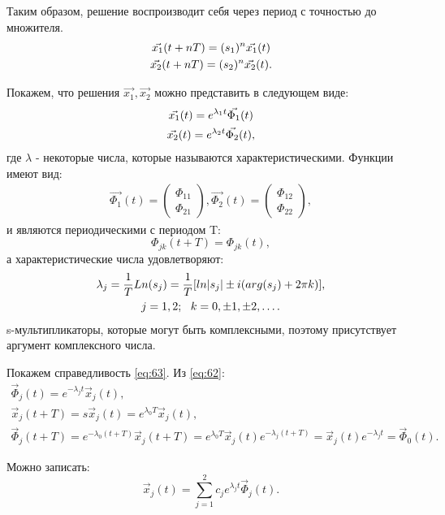 Таким образом, решение воспроизводит себя через период с точностью до множителя. 
\begin{gather}
	\vec{x_1}(t+nT)=(s_1)^n\vec{x_1}(t) \notag \\ 
	\vec{x_2}(t+nT)=(s_2)^n\vec{x_2}(t).		
	\label{eq:61}
\end{gather}

Покажем, что решения $\vec{x_1},\vec{x_2}$ можно представить в следующем виде:
\begin{gather}
	\vec{x_1}(t)=e^{\lambda_1t}\vec{\Phi_1}(t) \notag \\ 
	\vec{x_2}(t)=e^{\lambda_2t}\vec{\Phi_2}(t),		
	\label{eq:62}
\end{gather}
где $\lambda$ - некоторые числа, которые называются характеристическими. Функции имеют вид:
\begin{gather*}
	\vec{\Phi_1}(t)= 
	\begin{pmatrix}
		\Phi_{11} \\
		\Phi_{21}
	\end{pmatrix}
	,
	\vec{\Phi_2}(t)= 
	\begin{pmatrix}
		\Phi_{12} \\
		\Phi_{22}
	\end{pmatrix}
	,
\end{gather*}
и являются периодическими с периодом T:
\begin{equation}
	\Phi_{jk}(t+T)=\Phi_{jk}(t),
	\label{eq:63}
\end{equation}
а характеристические числа удовлетворяют:
\begin{gather}
	\lambda_j=\frac{1}{T}Ln(s_j)=\frac1{T}\qty[ln|s_j|\pm i(arg(s_j)+2\pi k)], \notag \\
	j=1,2;~~k=0,\pm 1, \pm 2, \dots.
	\label{eq:64}
\end{gather}
s-мультипликаторы, которые могут быть комплексными, поэтому присутствует аргумент комплексного числа.

Покажем справедливость \eqref{eq:63}. Из \eqref{eq:62}:
\begin{gather*}
	\vec{\Phi}_j(t)=e^{-\lambda_j t}\vec{x}_j(t), \\
	\vec{x}_j(t+T)=s\vec{x}_j(t)=e^{\lambda_0 T}\vec{x}_j(t), \\
	\vec{\Phi}_j(t+T)=e^{-\lambda_0(t+T)}\vec{x}_j(t+T)=e^{\lambda_0 T}\vec{x}_j(t)e^{-\lambda_j(t+T)}=\vec{x}_j(t)e^{-\lambda_j t}=\vec{\Phi}_0(t).
\end{gather*}

Можно записать:
\begin{equation}
	\vec{x}_j(t)=\sum_{j=1}^2 c_j e^{\lambda_j t}\vec{\Phi}_j(t).
	\label{eq:65}
\end{equation}

